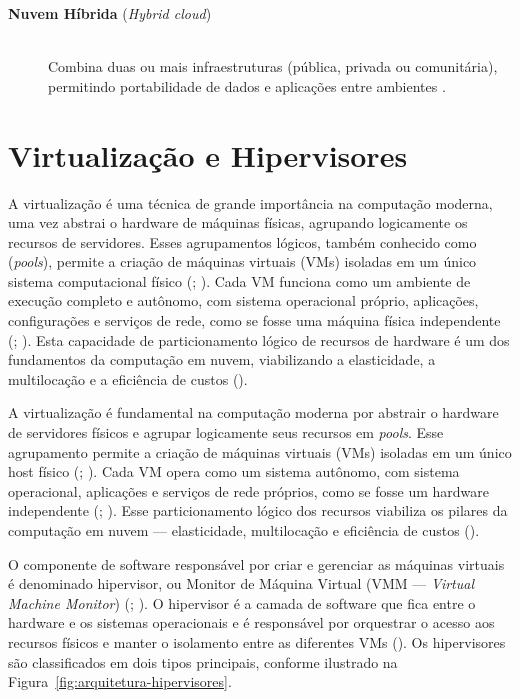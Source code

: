 \begin{itemize}
\begin{description}
  \item[\textbf{Nuvem Híbrida} (\textit{Hybrid cloud})] \hfill \\ Combina duas ou mais infraestruturas (pública, privada ou comunitária), permitindo portabilidade de dados e aplicações entre ambientes \cite{mell2011}.
\end{description}
 

\section{Virtualização e Hipervisores}
A virtualização é uma técnica de grande importância na computação moderna, uma vez  abstrai o hardware de máquinas físicas, agrupando logicamente os recursos de servidores. Esses agrupamentos lógicos, também conhecido como (\textit{pools}), permite a criação de máquinas virtuais (VMs) isoladas em um único sistema computacional físico (\cite{carissimi2008}; \cite{kominos2017}). Cada VM funciona como um ambiente de execução completo e autônomo, com sistema operacional próprio, aplicações, configurações e  serviços de rede, como se fosse uma máquina física independente (\cite{carissimi2008}; \cite{smith2005}). Esta capacidade de particionamento lógico de recursos de hardware é um dos fundamentos da computação em nuvem, viabilizando a elasticidade, a multilocação e a eficiência de custos (\cite{chawla2025}).

A virtualização é fundamental na computação moderna por abstrair o hardware de servidores físicos e agrupar logicamente seus recursos em \textit{pools}. Esse agrupamento permite a criação de máquinas virtuais (VMs) isoladas em um único host físico (\cite{carissimi2008}; \cite{kominos2017}). Cada VM opera como um sistema autônomo, com sistema operacional, aplicações e serviços de rede próprios, como se fosse um hardware independente (\cite{carissimi2008}; \cite{smith2005}). Esse particionamento lógico dos recursos viabiliza os pilares da computação em nuvem — elasticidade, multilocação e eficiência de custos (\cite{chawla2025}).

O componente de software responsável por criar e gerenciar as máquinas virtuais é denominado hipervisor, ou Monitor de Máquina Virtual (VMM — \textit{Virtual Machine Monitor}) (\cite{chawla2025}; \cite{carissimi2008}). O hipervisor é a camada de software que fica entre o hardware e os sistemas operacionais e é responsável por orquestrar o acesso aos recursos físicos e manter o isolamento entre as diferentes VMs (\cite{chawla2025}). Os hipervisores são classificados em dois tipos principais, conforme ilustrado na Figura~\ref{fig:arquitetura-hipervisores}.


\end{itemize}
